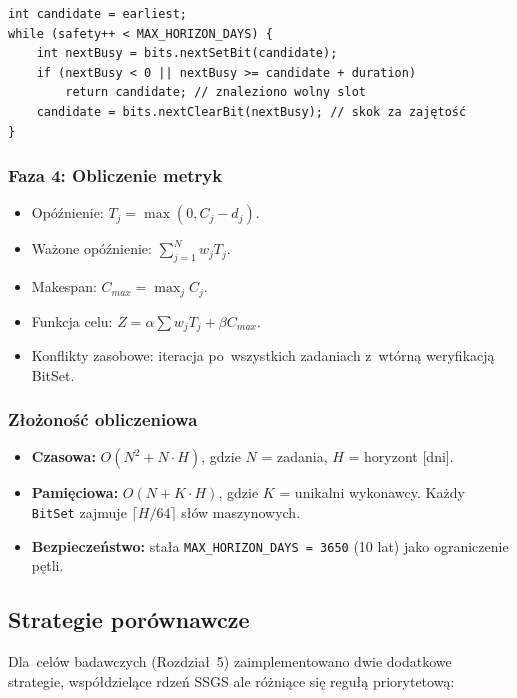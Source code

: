 \begin{verbatim}
int candidate = earliest;
while (safety++ < MAX_HORIZON_DAYS) {
    int nextBusy = bits.nextSetBit(candidate);
    if (nextBusy < 0 || nextBusy >= candidate + duration)
        return candidate; // znaleziono wolny slot
    candidate = bits.nextClearBit(nextBusy); // skok za zajętość
}
\end{verbatim}

\subsubsection{Faza 4: Obliczenie metryk}

\begin{itemize}
    \item Opóźnienie: $T_j = \max(0, C_j - d_j)$.
    \item Ważone opóźnienie: $\sum_{j=1}^{N} w_j T_j$.
    \item Makespan: $C_{max} = \max_j C_j$.
    \item Funkcja celu: $Z = \alpha \sum w_j T_j + \beta C_{max}$.
    \item Konflikty zasobowe: iteracja po~wszystkich zadaniach z~wtórną weryfikacją BitSet.
\end{itemize}

\subsubsection{Złożoność obliczeniowa}

\begin{itemize}
    \item \textbf{Czasowa:} $O(N^2 + N \cdot H)$, gdzie $N$ = zadania, $H$ = horyzont [dni].
    \item \textbf{Pamięciowa:} $O(N + K \cdot H)$, gdzie $K$ = unikalni wykonawcy. Każdy \texttt{BitSet} zajmuje $\lceil H/64 \rceil$ słów maszynowych.
    \item \textbf{Bezpieczeństwo:} stała \texttt{MAX\_HORIZON\_DAYS = 3650} (10 lat) jako ograniczenie pętli.
\end{itemize}

\subsection{Strategie porównawcze}

Dla~celów badawczych (Rozdział~5) zaimplementowano dwie dodatkowe strategie, współdzielące rdzeń SSGS ale różniące się regułą priorytetową:

